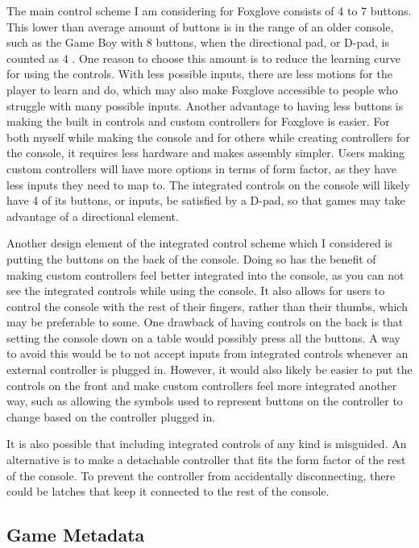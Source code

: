 \documentclass[10pt,twocolumn]{article}
\begin{document}
The main control scheme I am considering for
Foxglove consists of 4 to 7
buttons. This lower than average amount of buttons is in the range of an older
console, such as the Game Boy with 8 buttons,
when the directional pad, or D-pad,
is counted as 4 \cite{de_winkel_battery-free_2020}.
One reason to choose this amount is to
reduce the learning curve for using the controls. With less possible inputs,
there are less motions for the player to learn and do, which may also make
Foxglove accessible to people who struggle with many possible inputs.
Another
advantage to having less buttons is making the built in controls and custom
controllers for Foxglove is easier.
For both myself while making the console and
for others while creating controllers for the console, it requires less hardware
and makes assembly simpler. Users making custom controllers will have more
options in terms of form factor, as they have less inputs they need to map to.
The integrated controls on the console will likely have 4 of its buttons, or
inputs, be satisfied by a D-pad, so that games may take advantage of a
directional element.

Another design element of the integrated control scheme which I considered
is putting the buttons on the back of the console. Doing so has the benefit of
making custom controllers feel better integrated into the console, as you can
not see the integrated controls while using the console. It also allows for
users to control the console with the rest of their fingers, rather than
their thumbs, which may be preferable to some. One drawback of having controls
on the back is that setting the console down on a table would possibly press all
the buttons. A way to avoid this would be to not accept inputs from integrated
controls whenever an external controller is plugged in. However, it would also
likely be easier to put the controls on the front and make custom controllers
feel more integrated another way, such as allowing the symbols used to represent
buttons on the controller to change based on the controller plugged in.

It is also possible that including integrated controls of any kind is misguided.
An alternative is to make a detachable controller that fits the form factor of
the rest of the console. To prevent the controller from accidentally
disconnecting, there could be latches that keep it connected to the rest of the
console.

\subsection{Game Metadata}
\end{document}
